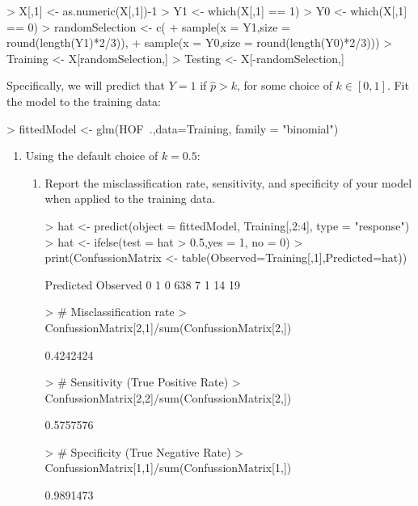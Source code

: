 \documentclass[12pt,a4paper]{paper}
\begin{document}
\begin{enumerate}
\begin{Schunk}
\begin{Sinput}
> X[,1] <- as.numeric(X[,1])-1
> Y1 <- which(X[,1] == 1)
> Y0 <- which(X[,1] == 0)
> randomSelection <- c(
+   sample(x = Y1,size = round(length(Y1)*2/3)), 
+   sample(x = Y0,size = round(length(Y0)*2/3)))
> Training <- X[randomSelection,]
> Testing <- X[-randomSelection,]
\end{Sinput}
\end{Schunk}
Specifically, we will predict that $Y = 1$ if $\hat{p} > k$, for some choice of $k \in \left[0, 1\right]$. Fit the model to the training data:
\begin{Schunk}
\begin{Sinput}
> fittedModel <- glm(HOF~.,data=Training, family = "binomial")
\end{Sinput}
\end{Schunk}
\begin{enumerate}
\item Using the default choice of $k = 0.5$:
\begin{enumerate}
\item Report the misclassification rate, sensitivity, and specificity of your model when applied to the training data.
\begin{Schunk}
\begin{Sinput}
> hat <- predict(object = fittedModel, Training[,2:4], type = "response")
> hat <- ifelse(test = hat > 0.5,yes = 1, no = 0)
> print(ConfussionMatrix <- table(Observed=Training[,1],Predicted=hat))
\end{Sinput}
\begin{Soutput}
        Predicted
Observed   0   1
       0 638   7
       1  14  19
\end{Soutput}
\begin{Sinput}
> # Misclassification rate
> ConfussionMatrix[2,1]/sum(ConfussionMatrix[2,])
\end{Sinput}
\begin{Soutput}
[1] 0.4242424
\end{Soutput}
\begin{Sinput}
> # Sensitivity (True Positive Rate)
> ConfussionMatrix[2,2]/sum(ConfussionMatrix[2,])
\end{Sinput}
\begin{Soutput}
[1] 0.5757576
\end{Soutput}
\begin{Sinput}
> # Specificity (True Negative Rate)
> ConfussionMatrix[1,1]/sum(ConfussionMatrix[1,])
\end{Sinput}
\begin{Soutput}
[1] 0.9891473
\end{Soutput}

\end{Schunk}
\end{enumerate}
\end{enumerate}
\end{enumerate}
\end{document}
